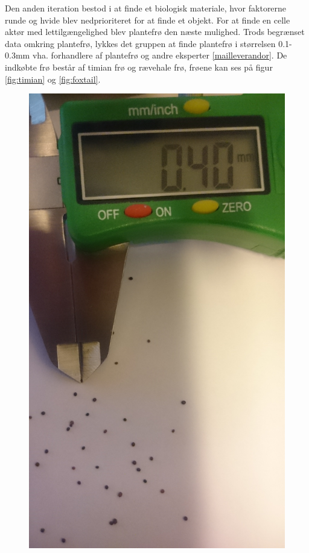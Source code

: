 Den anden iteration bestod i at finde et biologisk materiale, hvor faktorerne runde og hvide blev nedprioriteret for at finde et objekt. For at finde en celle aktør med lettilgængelighed blev plantefrø den næste mulighed. Trods begrænset data omkring plantefrø, lykkes det gruppen at finde plantefrø i størrelsen 0.1-0.3mm vha. forhandlere af plantefrø og andre eksperter \ref{mailleverandor}. De indkøbte frø består af timian frø og rævehale frø, frøene kan ses på figur \ref{fig:timian} og \ref{fig:foxtail}.

 \begin{figure}[htbp] \centering
\begin{minipage}[b]{0.48\textwidth} \centering
\includegraphics[width=1.00\textwidth]{billeder/Hovedrapport/timian.jpg} %

\end{minipage}
\end{figure}
